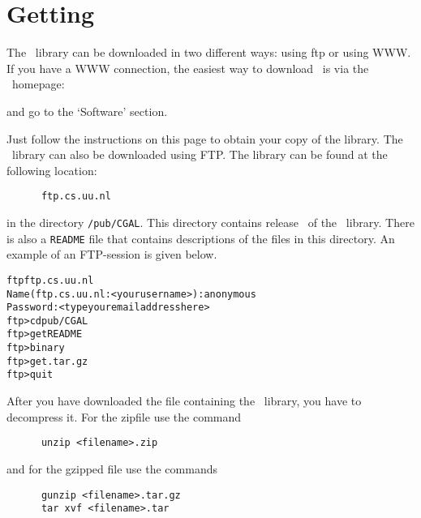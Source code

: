 

\section{Getting \cgal}

The \cgal\ library can be downloaded in two different ways: using ftp
or using WWW.  If you have a WWW connection, the easiest way to
download \cgal\ is via the \cgal\ homepage:
\begin{quote}
      \cgalhomepage
\end{quote}
and go to the `Software' section.

Just follow the instructions on this page to obtain your copy of the
library. The \cgal\ library can also be downloaded using FTP. The
library can be found at the following location:

\begin{verbatim}
      ftp.cs.uu.nl
\end{verbatim}

in the directory \texttt{/pub/CGAL}. This directory contains release
\cgalrelease\ of the \cgal\ library. There is also a \texttt{README}
file that contains descriptions of the files in this directory. An
example of an FTP-session is given below.

\begin{alltt}
       ftp ftp.cs.uu.nl 
      Name (ftp.cs.uu.nl:<your username>): anonymous
      Password: <type your email address here>
      ftp> cd pub/CGAL
      ftp> get README
      ftp> binary
      ftp> get \cgaldir.tar.gz
      ftp> quit
\end{alltt}

After you have downloaded the file containing the \cgal\ library, you
have to decompress it. For the zipfile use the command

\begin{verbatim}
      unzip <filename>.zip
\end{verbatim}

and for the gzipped file use the commands

\begin{verbatim}
      gunzip <filename>.tar.gz
      tar xvf <filename>.tar
\end{verbatim}


